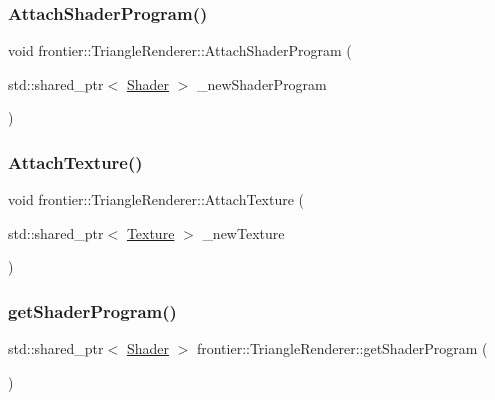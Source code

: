 \subsubsection{\texorpdfstring{Attach\+Shader\+Program()}{AttachShaderProgram()}}
{\footnotesize\ttfamily void frontier\+::\+Triangle\+Renderer\+::\+Attach\+Shader\+Program (\begin{DoxyParamCaption}\item[{std\+::shared\+\_\+ptr$<$ \hyperlink{classfrontier_1_1_shader}{Shader} $>$}]{\+\_\+new\+Shader\+Program }\end{DoxyParamCaption})}

\mbox{\label{classfrontier_1_1_triangle_renderer_ab8cee7fc9eb0fcb70f40a646424aff96}} 
\subsubsection{\texorpdfstring{Attach\+Texture()}{AttachTexture()}}
{\footnotesize\ttfamily void frontier\+::\+Triangle\+Renderer\+::\+Attach\+Texture (\begin{DoxyParamCaption}\item[{std\+::shared\+\_\+ptr$<$ \hyperlink{classfrontier_1_1_texture}{Texture} $>$}]{\+\_\+new\+Texture }\end{DoxyParamCaption})}

\mbox{\label{classfrontier_1_1_triangle_renderer_a3645cd255e151c90480903d8c5907aac}} 
\subsubsection{\texorpdfstring{get\+Shader\+Program()}{getShaderProgram()}}
{\footnotesize\ttfamily std\+::shared\+\_\+ptr$<$ \hyperlink{classfrontier_1_1_shader}{Shader} $>$ frontier\+::\+Triangle\+Renderer\+::get\+Shader\+Program (\begin{DoxyParamCaption}{ }\end{DoxyParamCaption})}

